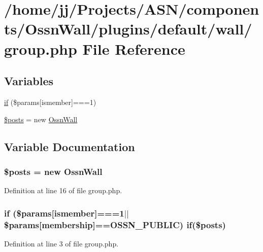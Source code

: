 \hypertarget{_ossn_wall_2plugins_2default_2wall_2group_8php}{}\section{/home/jj/\+Projects/\+A\+S\+N/components/\+Ossn\+Wall/plugins/default/wall/group.php File Reference}
\label{_ossn_wall_2plugins_2default_2wall_2group_8php}
\subsection*{Variables}
\begin{DoxyCompactItemize}
\item 
\hyperlink{_ossn_wall_2plugins_2default_2wall_2group_8php_ae1b372eab6e8aa1a9c2def81f6e8bc79}{if} (\$params\mbox{[}\textquotesingle{}ismember\textquotesingle{}\mbox{]}===1)
\item 
\hyperlink{_ossn_wall_2plugins_2default_2wall_2group_8php_a9f4cad5a721e7f7711fba0bf0f7ec273}{\$posts} = new \hyperlink{class_ossn_wall}{Ossn\+Wall}
\end{DoxyCompactItemize}


\subsection{Variable Documentation}
\subsubsection[{\texorpdfstring{\$posts}{$posts}}]{\setlength{\rightskip}{0pt plus 5cm}\$posts = new {\bf Ossn\+Wall}}\hypertarget{_ossn_wall_2plugins_2default_2wall_2group_8php_a9f4cad5a721e7f7711fba0bf0f7ec273}{}\label{_ossn_wall_2plugins_2default_2wall_2group_8php_a9f4cad5a721e7f7711fba0bf0f7ec273}


Definition at line 16 of file group.\+php.

\subsubsection[{\texorpdfstring{if}{if}}]{\setlength{\rightskip}{0pt plus 5cm}if (\$params\mbox{[}\textquotesingle{}ismember\textquotesingle{}\mbox{]}===1$\vert$$\vert$\$params\mbox{[}\textquotesingle{}membership\textquotesingle{}\mbox{]}=={\bf O\+S\+S\+N\+\_\+\+P\+U\+B\+L\+IC}) if(\$posts)}\hypertarget{_ossn_wall_2plugins_2default_2wall_2group_8php_ae1b372eab6e8aa1a9c2def81f6e8bc79}{}\label{_ossn_wall_2plugins_2default_2wall_2group_8php_ae1b372eab6e8aa1a9c2def81f6e8bc79}


Definition at line 3 of file group.\+php.

